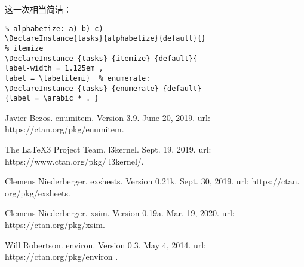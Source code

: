 \documentclass[a4paper,12pt,indent]{article}
\begin{document}
这一次相当简洁：

    \begin{tcolorbox}[collower=black,colframe=Tasks,colback=white]
        \begin{lstlisting}
% alphabetize: a) b) c)
\DeclareInstance{tasks}{alphabetize}{default}{}
% itemize
\DeclareInstance {tasks} {itemize} {default}{
label-width = 1.125em ,
label = \labelitemi}  % enumerate:
\DeclareInstance {tasks} {enumerate} {default}
{label = \arabic * . }
    \end{lstlisting}
        \end{tcolorbox}

\begin{thebibliography}{9}

 Javier Bezos. enumitem. Version 3.9. June 20, 2019. url: https://ctan.org/pkg/enumitem.

 The \LaTeX{}3 Project Team. l3kernel. Sept. 19, 2019.
url: https://www.ctan.org/pkg/ l3kernel/.

 Clemens Niederberger. exsheets. Version 0.21k. Sept. 30, 2019.
url: https://ctan. org/pkg/exsheets.

 Clemens Niederberger. xsim. Version 0.19a. Mar. 19, 2020.
url: https://ctan.org/pkg/xsim.

 Will Robertson. environ. Version 0.3. May 4, 2014.
url: https://ctan.org/pkg/environ .

\end{thebibliography}
\end{document}
